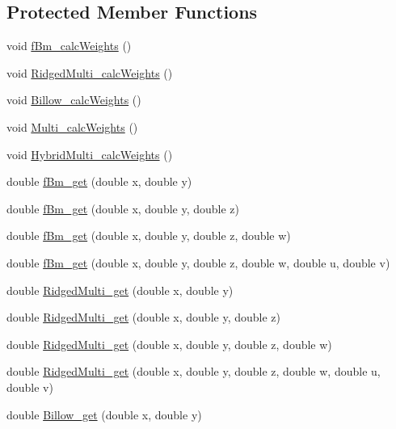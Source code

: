 \subsection*{Protected Member Functions}
\begin{DoxyCompactItemize}
\item 
void \hyperlink{classanl_1_1CImplicitFractal_ae2d92c0dfc87bd09be6fa7b7c7fcefd5}{fBm\_\-calcWeights} ()
\item 
void \hyperlink{classanl_1_1CImplicitFractal_a62ca6a52ef19f71d34f26ee8f8143b9c}{RidgedMulti\_\-calcWeights} ()
\item 
void \hyperlink{classanl_1_1CImplicitFractal_a4af9b4cb67e0e7c1e44195b2c5f4c0d9}{Billow\_\-calcWeights} ()
\item 
void \hyperlink{classanl_1_1CImplicitFractal_ac52a77e29297d63001965aaeb8f4222b}{Multi\_\-calcWeights} ()
\item 
void \hyperlink{classanl_1_1CImplicitFractal_af457e038a50d1f76daa14ad195970361}{HybridMulti\_\-calcWeights} ()
\item 
double \hyperlink{classanl_1_1CImplicitFractal_a2cb0ace77e8510310288c952980fb679}{fBm\_\-get} (double x, double y)
\item 
double \hyperlink{classanl_1_1CImplicitFractal_a5cab5811294494481b6192e363fa1f0b}{fBm\_\-get} (double x, double y, double z)
\item 
double \hyperlink{classanl_1_1CImplicitFractal_a3b06159c0b1cefbeeeb92d7af4884671}{fBm\_\-get} (double x, double y, double z, double w)
\item 
double \hyperlink{classanl_1_1CImplicitFractal_ad599dde07a117b1a6b3ec867bd343356}{fBm\_\-get} (double x, double y, double z, double w, double u, double v)
\item 
double \hyperlink{classanl_1_1CImplicitFractal_ab27066fe7b659cbbb50947f7c668cb77}{RidgedMulti\_\-get} (double x, double y)
\item 
double \hyperlink{classanl_1_1CImplicitFractal_af29ca0d4a57093b9a66bc85fa4926730}{RidgedMulti\_\-get} (double x, double y, double z)
\item 
double \hyperlink{classanl_1_1CImplicitFractal_a11514bff560a6d31726b015c95dbe525}{RidgedMulti\_\-get} (double x, double y, double z, double w)
\item 
double \hyperlink{classanl_1_1CImplicitFractal_a91ded79224e96927f4948fe0d553751c}{RidgedMulti\_\-get} (double x, double y, double z, double w, double u, double v)
\item 
double \hyperlink{classanl_1_1CImplicitFractal_ae93e8800e17b8632d8cbb7207c35389a}{Billow\_\-get} (double x, double y)

\end{DoxyCompactItemize}

